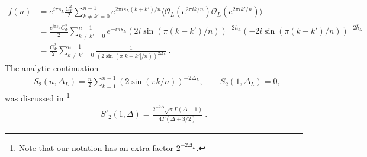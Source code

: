 \documentclass[11pt]{article}
\newcommand{\mO}{\mathcal{O}}
\newcommand{\nn}{\nonumber}
\begin{document}
  \begin{align}\label{fnexpression1}
    f(n) & =e^{i\pi s_L} \frac{C_{\Psi}^{2}}{2}\sum_{k\neq k'=0}^{n-1}e^{2\pi i s_L (k+k')/n}\langle \mO_{L}(e^{2\pi i k/n})\mO_{L}(e^{2\pi i k'/n})\rangle \nn    \\
    &=\frac{e^{i\pi s_L} C_{\Psi}^2}{2}\sum_{k\neq k'=0}^{n-1}e^{-i\pi s_L}(2i\sin(\pi(k-k')/n))^{-2h_L}(-2i\sin(\pi(k-k')/n))^{-2\bar{h}_L}\nn\\
         & =\frac{C_{\Psi}^2}{2}\sum_{k\neq k'=0}^{n-1}\frac{1}{(2\sin(\pi |k-k'|/n))^{2\Delta_L}}\ .
  \end{align}
  The analytic continuation
  \begin{align}
     & S_{2}(n,\Delta_L)=\frac{n}{2}\sum_{k=1}^{n-1}(2\sin(\pi k/n))^{-2\Delta_L},\qquad S_{2}(1,\Delta_L)=0,
  \end{align}
  was discussed in
  \cite{calabrese2011entanglement}\footnote{Note that our notation has an extra factor $2^{-2\Delta_L}$.}
  \begin{align}
    S'_{2}(1,\Delta)=\frac{2^{-2\Delta}\sqrt{\pi}\Gamma(\Delta+1)}{4\Gamma(\Delta+3/2)}\ .
  \end{align}
\end{document}

